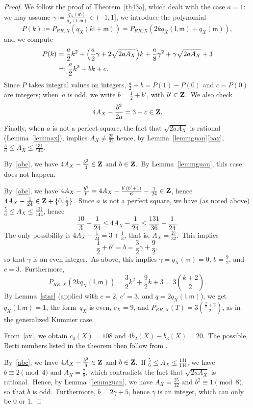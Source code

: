 \documentclass[12pt]{amsart}
\def\Z{{\bf Z}}
\theoremstyle{remark}
\def\lll{\ensuremath{\mathsf l}}
\def\mm{\ensuremath{\mathsf m}}
\begin{document}
\begin{proof}
We follow the proof of Theorem~\ref{th43a}, which dealt with the case $a=1$:  we may assume  $\gamma\coloneqq \frac{q_X(\mm)}{q_X(\lll,\mm)}\in (-1,1] $, we introduce the polynomial
$$P(k)\coloneqq P_{RR,X}(q_X(k\lll+ \mm))=P_{RR,X}(2kq_X(\lll,\mm)+q_X(\mm)),$$
and we compute
\begin{align*}
 P(k)&=\frac{a}{2}k^2+\Bigl( \frac{a}{2}\gamma+2\sqrt{2aA_X} \Bigr)k+\frac{a}{8}\gamma^2+ \gamma\sqrt{2aA_X}+3\\
 &=:\frac{a}{2}k^2 +  b  k +c.
\end{align*}
Since $P$ takes integral values on integers, $\frac{a}2+b=P(1)-P(0)$ and $c=P(0)$ are integers; when~$a$ is odd, we write $b=\frac12+b'$, with $b'\in\Z$.\ We also check
 \begin{equation}\label{abc}
    4A_X-\frac{b^2}{2a} =3-c \in\Z.
\end{equation}
 Finally, when $a$ is not a perfect square, the fact that $\sqrt{2aA_X}$ is rational (Lemma~\ref{lemmax}), implies $A_X\ne\frac{25}{32}$ hence, by Lemma~\ref{lemmguan}\ref{bax},    $\frac56\le A_X\le\frac{131}{144}$.



 By~\eqref{abc}, we  have $4A_X-\frac{b^2}4\in\Z$ and $b\in\Z$.\ By Lemma~\ref{lemmguan}, this case does not happen.

\medskip
{} By~\eqref{abc}, we  have $4A_X- \frac{b^2}6=4A_X-\frac{b'(b'+1)}6-\frac1{24}\in\Z$, hence $4A_X -\frac1{24}\in \Z+\{0,\frac13\}$.\
Since $a$ is not a perfect square, we have (as noted above) $\frac{5}{6}\le A_X\le\frac{131}{144} $, hence
\[
\frac{10}{3} -\frac1{24} \le 4A_X -\frac1{24}\le\frac{131}{36} -\frac1{24}.
\]
The only possibility is  $4A_X-\frac1{24}=3+\frac{1}3$, that is, $A_X=\frac{27}{32}$.\
This implies
$$\frac12+b'=b=\frac{3}{2}\gamma+\frac92,$$
so that $\gamma$ is an even integer.\ As above, this implies $\gamma=q_X(\mm)=0$, $b=\frac92$, and $c = 3$.\ Furthermore,
\[
P_{RR,X}(2kq_X(\lll,\mm))=  \frac{3}{2}k^2 +  \frac92  k +3=3\binom{k+2}{2}.
\]
By Lemma~\ref{star} (applied with $c=2$, $c'=3$, and $q=2q_X(\lll,\mm)$),
we get $q_X(\lll,\mm)=1$, the form~$q_X$ is even, $c_X=9$, and $P_{RR,X}(T)=   3\binom{\frac{T}2+2}{2}$, as in the generalized Kummer case.


From~\eqref{ax}, we obtain $c_4(X)=108$ and $4b_2(X)-b_3(X)=20 $.\
The possible Betti numbers listed in the theorem then follow from \cite{gua}.

\medskip
\noindent{\bf Case $a=4$.} By~\eqref{abc}, we   have $4A_X-\frac{b^2}8\in\Z$ and $b\in\Z$.\
If $\frac{5}{6}\le A_X\le\frac{131}{144} $, we have $b\equiv 2\pmod4$ and $A_X=\frac78$, which contradicts the fact that $\sqrt{2aA_X}$ is   rational.\
Hence, by Lemma~\ref{lemmguan}, we have $A_X=\frac{25}{32}$ and $b^2\equiv 1\pmod8$, so that $b$ is odd.\ Furthermore, $b=2\gamma +5$, hence $\gamma$ is an integer, which can only be $0$ or $1$.


\end{proof}
\end{document}
